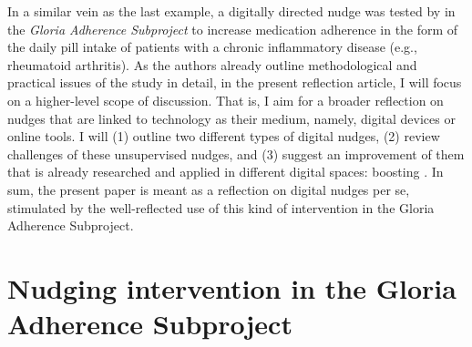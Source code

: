\documentclass[reflection, authordate]{jote-new-article}
\begin{document}


\begin{companion}
\end{companion}

In a similar vein as the last example, a digitally directed nudge was tested by \textcite{Hartman2021} in the \emph{Gloria Adherence Subproject} to increase medication adherence in the form of the daily pill intake of patients with a chronic inflammatory disease (e.g., rheumatoid arthritis). As the authors already outline methodological and practical issues of the study in detail, in the present reflection article, I will focus on a higher-level scope of discussion. That is, I aim for a broader reflection on nudges that are linked to technology as their medium, namely, digital devices or online tools. I will (1) outline two different types of digital nudges, (2) review challenges of these unsupervised nudges, and (3) suggest an improvement of them that is already researched and applied in different digital spaces: boosting \parencites[e.g.][]{Hertwig2017}{Hertwig2017a}{Lorenz-Spreen2021}{Reijula2022}. In sum, the present paper is meant as a reflection on digital nudges per se, stimulated by the well-reflected use of this kind of intervention in the Gloria Adherence Subproject.



\section{Nudging intervention in the Gloria Adherence Subproject}
\end{document}
